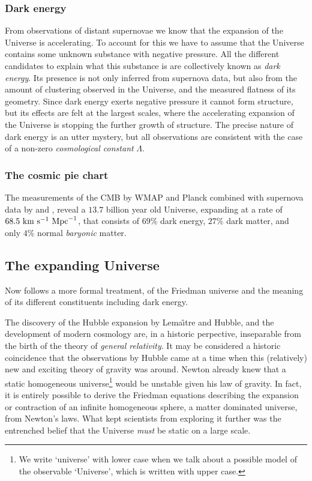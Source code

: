 \subsubsection{Dark energy}
From observations of distant supernovae \citep{Riess1998,Perlmutter1999} we know that the expansion of the Universe is accelerating. To account for this we have to assume that the Universe contains some unknown substance with negative pressure. All the different candidates to explain what this substance is are collectively known as \emph{dark energy}. Its presence is not only inferred from supernova data, but also from the amount of clustering observed in the Universe, and the measured flatness of its geometry. Since dark energy exerts negative pressure it cannot form structure, but its effects are felt at the largest scales, where the accelerating expansion of the Universe is stopping the further growth of structure. The precise nature of dark energy is an utter mystery, but all observations are consistent with the case of a non-zero \emph{cosmological constant} $\Lambda$.

\subsubsection{The cosmic pie chart}
The measurements of the \ac{CMB} by \ac{WMAP} \citep{Komatsu2003} and Planck \citep{Planck2013-pp} combined with supernova data by \citet{Perlmutter1999} and \citet{Riess1998}, reveal a $13.7$ billion year old Universe, expanding at a rate of $68.5\ {\rm km}\ {\rm s}^{-1}\ {\rm Mpc}^{-1}$, that consists of $69\%$ dark energy, $27\%$ dark matter, and only $4\%$ normal \emph{baryonic} matter.


\subsection{The expanding Universe}
Now follows a more formal treatment, of the Friedman universe and the meaning of its different constituents including dark energy.

The discovery of the Hubble expansion by Lema\^{\i}tre and Hubble, and the development of modern cosmology are, in a historic perpective, inseparable from the birth of the theory of \emph{general relativity}. It may be considered a historic coincidence that the observations by Hubble came at a time when this (relatively) new and exciting theory of gravity was around.
Newton already knew that a static homogeneous universe\footnote{We write `universe' with lower case when we talk about a possible model of the observable `Universe', which is written with upper case.} would be unstable given his law of gravity. In fact, it is entirely possible to derive the Friedman equations describing the expansion or contraction of an infinite homogeneous sphere, a matter dominated universe, from Newton's laws. What kept scientists from exploring it further was the entrenched belief that the Universe \emph{must} be static on a large scale.

